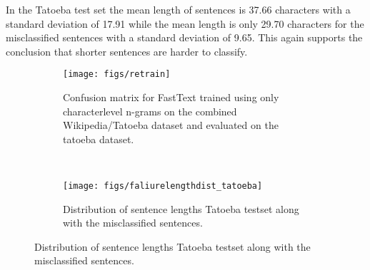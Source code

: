  In the Tatoeba test set the mean length of sentences is 37.66 characters with a standard deviation of 17.91 while the mean length is only 29.70 characters for the misclassified sentences with a standard deviation of 9.65. This again supports the conclusion that shorter sentences are harder to classify.

\begin{figure}[h!]
    \begin{subfigure}[b]{0.45\textwidth}
      \texttt{[image: figs/retrain]}
      \caption{Confusion matrix for FastText trained using only characterlevel n-grams on the combined Wikipedia/Tatoeba dataset and evaluated on the tatoeba dataset.}
      \label{retrain-confuss}
    \end{subfigure}
    ~
    \begin{subfigure}[b]{0.45\textwidth}
        \texttt{[image: figs/faliurelengthdist\_tatoeba]}
        \caption{Distribution of sentence lengths Tatoeba testset along with the misclassified sentences.}
     \label{retrain-lengths}
    \end{subfigure}
\end{figure}






%
%
